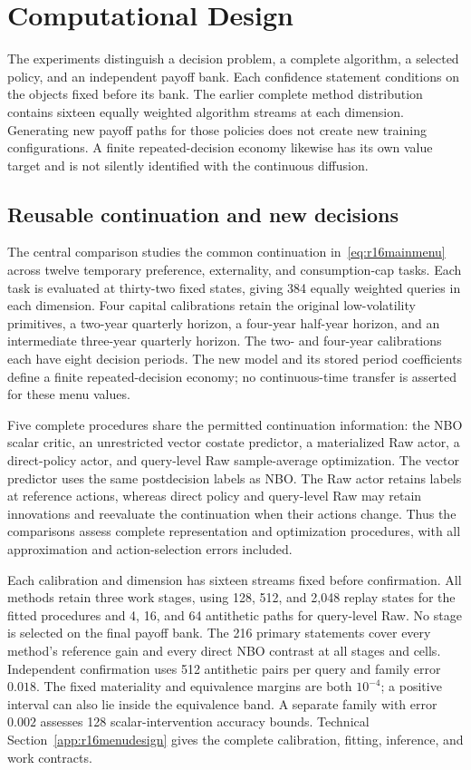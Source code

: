 \section{Computational Design}\label{sec:r16design}
The experiments distinguish a decision problem, a complete algorithm, a selected policy, and an independent payoff bank. Each confidence statement conditions on the objects fixed before its bank. The earlier complete method distribution contains sixteen equally weighted algorithm streams at each dimension. Generating new payoff paths for those policies does not create new training configurations. A finite repeated-decision economy likewise has its own value target and is not silently identified with the continuous diffusion.

\subsection{Reusable continuation and new decisions}
\label{sec:r16reusedesign}
The central comparison studies the common continuation in~\eqref{eq:r16mainmenu} across twelve temporary preference, externality, and consumption-cap tasks. Each task is evaluated at thirty-two fixed states, giving 384 equally weighted queries in each dimension. Four capital calibrations retain the original low-volatility primitives, a two-year quarterly horizon, a four-year half-year horizon, and an intermediate three-year quarterly horizon. The two- and four-year calibrations each have eight decision periods. The new model and its stored period coefficients define a finite repeated-decision economy; no continuous-time transfer is asserted for these menu values.

Five complete procedures share the permitted continuation information: the NBO scalar critic, an unrestricted vector costate predictor, a materialized Raw actor, a direct-policy actor, and query-level Raw sample-average optimization. The vector predictor uses the same postdecision labels as NBO. The Raw actor retains labels at reference actions, whereas direct policy and query-level Raw may retain innovations and reevaluate the continuation when their actions change. Thus the comparisons assess complete representation and optimization procedures, with all approximation and action-selection errors included.

Each calibration and dimension has sixteen streams fixed before confirmation. All methods retain three work stages, using 128, 512, and 2,048 replay states for the fitted procedures and 4, 16, and 64 antithetic paths for query-level Raw. No stage is selected on the final payoff bank. The 216 primary statements cover every method's reference gain and every direct NBO contrast at all stages and cells. Independent confirmation uses 512 antithetic pairs per query and family error $0.018$. The fixed materiality and equivalence margins are both $10^{-4}$; a positive interval can also lie inside the equivalence band. A separate family with error $0.002$ assesses 128 scalar-intervention accuracy bounds. Technical Section~\ref{app:r16menudesign} gives the complete calibration, fitting, inference, and work contracts.

